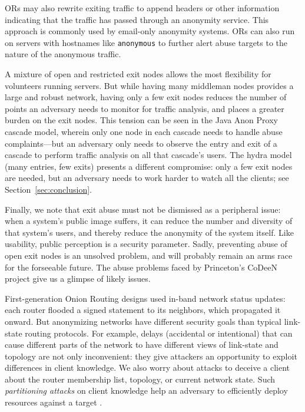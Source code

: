 \documentclass[times,10pt,twocolumn]{article}
\begin{document}
ORs may also rewrite exiting traffic to append
headers or other information indicating that the traffic has passed
through an anonymity service.  This approach is commonly used
by email-only anonymity systems.  ORs can also
run on servers with hostnames like {\tt anonymous} to further
alert abuse targets to the nature of the anonymous traffic.

A mixture of open and restricted exit nodes allows the most
flexibility for volunteers running servers. But while having many
middleman nodes provides a large and robust network,
having only a few exit nodes reduces the number of points
an adversary needs to monitor for traffic analysis, and places a
greater burden on the exit nodes.  This tension can be seen in the
Java Anon Proxy
cascade model, wherein only one node in each cascade needs to handle
abuse complaints---but an adversary only needs to observe the entry
and exit of a cascade to perform traffic analysis on all that
cascade's users. The hydra model (many entries, few exits) presents a
different compromise: only a few exit nodes are needed, but an
adversary needs to work harder to watch all the clients; see
Section~\ref{sec:conclusion}.

Finally, we note that exit abuse must not be dismissed as a peripheral
issue: when a system's public image suffers, it can reduce the number
and diversity of that system's users, and thereby reduce the anonymity
of the system itself.  Like usability, public perception is a
security parameter.  Sadly, preventing abuse of open exit nodes is an
unsolved problem, and will probably remain an arms race for the
forseeable future.  The abuse problems faced by Princeton's CoDeeN
project \cite{darkside} give us a glimpse of likely issues.

\label{subsec:dirservers}

First-generation Onion Routing designs \cite{freedom2-arch,or-jsac98} used
in-band network status updates: each router flooded a signed statement
to its neighbors, which propagated it onward. But anonymizing networks
have different security goals than typical link-state routing protocols.
For example, delays (accidental or intentional)
that can cause different parts of the network to have different views
of link-state and topology are not only inconvenient: they give
attackers an opportunity to exploit differences in client knowledge.
We also worry about attacks to deceive a
client about the router membership list, topology, or current network
state. Such \emph{partitioning attacks} on client knowledge help an
adversary to efficiently deploy resources
against a target \cite{minion-design}.
\end{document}
